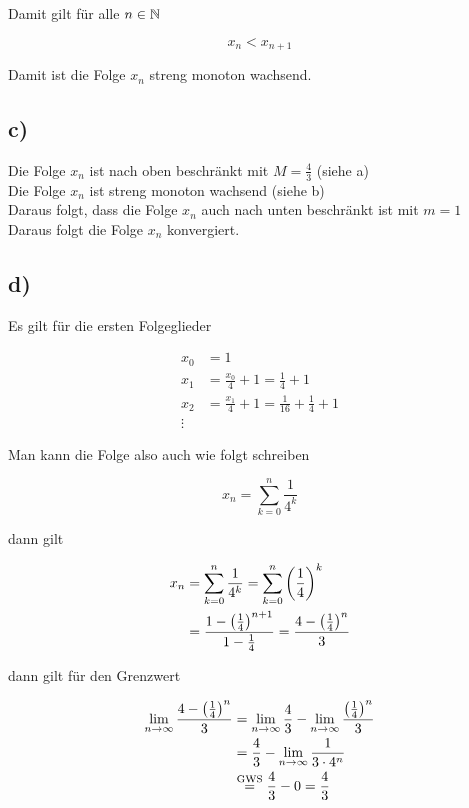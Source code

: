 \documentclass[a4paper, 11pt]{article}
\begin{document}
\pagebreak

Damit gilt für alle \(n \in \mathbb{N}\)

$$ x_n < x_{n+1} $$

Damit ist die Folge \(x_n\) streng monoton wachsend.

\subsection{c)}
\label{sec:org96cd89a}
Die Folge \(x_n\) ist nach oben beschränkt mit \(M = \frac{4}{3}\) (siehe a) \\

Die Folge \(x_n\) ist streng monoton wachsend (siehe b) \\

Daraus folgt, dass die Folge \(x_n\) auch nach unten beschränkt ist mit \(m = 1\) \\

Daraus folgt die Folge \(x_n\) konvergiert.

\subsection{d)}
\label{sec:orgfb37b5c}
Es gilt für die ersten Folgeglieder

\begin{align*}
    x_0 &= 1 \\
    x_1 &= \frac{x_0}{4} + 1 = \frac{1}{4} + 1 \\
    x_2 &= \frac{x_1}{4} + 1 = \frac{1}{16} + \frac{1}{4} + 1 \\
    \vdots
\end{align*}

Man kann die Folge also auch wie folgt schreiben

$$ x_n = \sum_{k = 0}^{n} \frac{1}{4^k} $$

dann gilt

\begin{align*}
    x_n &= \sum_{k = 0}^{n} \frac{1}{4^k}
    = \sum_{k = 0}^{n} \left(\frac{1}{4}\right)^k \\
    &= \frac{1 - \left(\frac{1}{4}\right)^{n+1}}{1 - \frac{1}{4}}
    = \frac{4 - \left(\frac{1}{4}\right)^n}{3}
\end{align*}

\pagebreak

dann gilt für den Grenzwert

\begin{align*}
    \lim_{n \rightarrow \infty} \frac{4 - \left(\frac{1}{4}\right)^n}{3} &=
        \lim_{n \rightarrow \infty} \frac{4}{3} -
        \lim_{n \rightarrow \infty} \frac{\left(\frac{1}{4}\right)^n}{3} \\
    &= \frac{4}{3} - \lim_{n \rightarrow \infty} \frac{1}{3 \cdot 4^n} \\
    & \overset{\text{GWS}}{=} \frac{4}{3} - 0 = \frac{4}{3}
\end{align*}
\end{document}
